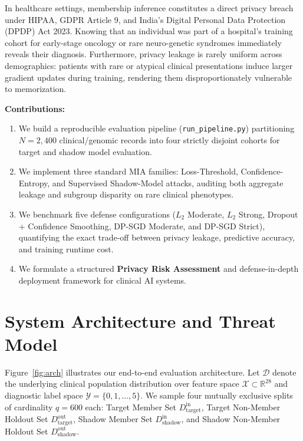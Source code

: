 \documentclass[10pt,twocolumn]{article}
\begin{document}
In healthcare settings, membership inference constitutes a direct privacy breach under HIPAA, GDPR Article 9, and India's Digital Personal Data Protection (DPDP) Act 2023. Knowing that an individual was part of a hospital's training cohort for early-stage oncology or rare neuro-genetic syndromes immediately reveals their diagnosis. Furthermore, privacy leakage is rarely uniform across demographics: patients with rare or atypical clinical presentations induce larger gradient updates during training, rendering them disproportionately vulnerable to memorization.

\textbf{Contributions:}
\begin{enumerate}
    \item We build a reproducible evaluation pipeline (\texttt{run\_pipeline.py}) partitioning $N=2,400$ clinical/genomic records into four strictly disjoint cohorts for target and shadow model evaluation.
    \item We implement three standard MIA families: Loss-Threshold, Confidence-Entropy, and Supervised Shadow-Model attacks, auditing both aggregate leakage and subgroup disparity on rare clinical phenotypes.
    \item We benchmark five defense configurations ($L_2$ Moderate, $L_2$ Strong, Dropout + Confidence Smoothing, DP-SGD Moderate, and DP-SGD Strict), quantifying the exact trade-off between privacy leakage, predictive accuracy, and training runtime cost.
    \item We formulate a structured \textbf{Privacy Risk Assessment} and defense-in-depth deployment framework for clinical AI systems.
\end{enumerate}

\section{System Architecture and Threat Model}
Figure~\ref{fig:arch} illustrates our end-to-end evaluation architecture. Let $\mathcal{D}$ denote the underlying clinical population distribution over feature space $\mathcal{X} \subset \mathbb{R}^{28}$ and diagnostic label space $\mathcal{Y} = \{0, 1, \dots, 5\}$. We sample four mutually exclusive splits of cardinality $q = 600$ each: Target Member Set $D_{\text{target}}^{\text{in}}$, Target Non-Member Holdout Set $D_{\text{target}}^{\text{out}}$, Shadow Member Set $D_{\text{shadow}}^{\text{in}}$, and Shadow Non-Member Holdout Set $D_{\text{shadow}}^{\text{out}}$.
\end{document}
